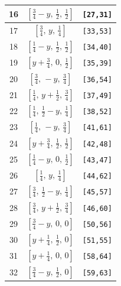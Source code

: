 \documentclass[fleqn,8pt]{jsarticle}
\begin{document}
\begin{longtable}{ccc}
16 & $\left[ \frac{3}{4} - y,\, \frac{1}{2},\, \frac{1}{2} \right]$ & {\tt [27,31]} \\ \hline
17 & $\left[ \frac{3}{4},\, y,\, \frac{1}{4} \right]$ & {\tt [33,53]} \\ \hline
18 & $\left[ \frac{1}{4} - y,\, \frac{1}{2},\, \frac{1}{2} \right]$ & {\tt [34,40]} \\ \hline
19 & $\left[ y + \frac{3}{4},\, 0,\, \frac{1}{2} \right]$ & {\tt [35,39]} \\ \hline
20 & $\left[ \frac{3}{4},\, - y,\, \frac{3}{4} \right]$ & {\tt [36,54]} \\ \hline
21 & $\left[ \frac{1}{4},\, y + \frac{1}{2},\, \frac{3}{4} \right]$ & {\tt [37,49]} \\ \hline
22 & $\left[ \frac{1}{4},\, \frac{1}{2} - y,\, \frac{1}{4} \right]$ & {\tt [38,52]} \\ \hline
23 & $\left[ \frac{1}{4},\, - y,\, \frac{3}{4} \right]$ & {\tt [41,61]} \\ \hline
24 & $\left[ y + \frac{3}{4},\, \frac{1}{2},\, \frac{1}{2} \right]$ & {\tt [42,48]} \\ \hline
25 & $\left[ \frac{1}{4} - y,\, 0,\, \frac{1}{2} \right]$ & {\tt [43,47]} \\ \hline
26 & $\left[ \frac{1}{4},\, y,\, \frac{1}{4} \right]$ & {\tt [44,62]} \\ \hline
27 & $\left[ \frac{3}{4},\, \frac{1}{2} - y,\, \frac{1}{4} \right]$ & {\tt [45,57]} \\ \hline
28 & $\left[ \frac{3}{4},\, y + \frac{1}{2},\, \frac{3}{4} \right]$ & {\tt [46,60]} \\ \hline
29 & $\left[ \frac{3}{4} - y,\, 0,\, 0 \right]$ & {\tt [50,56]} \\ \hline
30 & $\left[ y + \frac{1}{4},\, \frac{1}{2},\, 0 \right]$ & {\tt [51,55]} \\ \hline
31 & $\left[ y + \frac{1}{4},\, 0,\, 0 \right]$ & {\tt [58,64]} \\ \hline
32 & $\left[ \frac{3}{4} - y,\, \frac{1}{2},\, 0 \right]$ & {\tt [59,63]} \\
\end{longtable}
\renewcommand{\arraystretch}{1.2}
\end{document}
